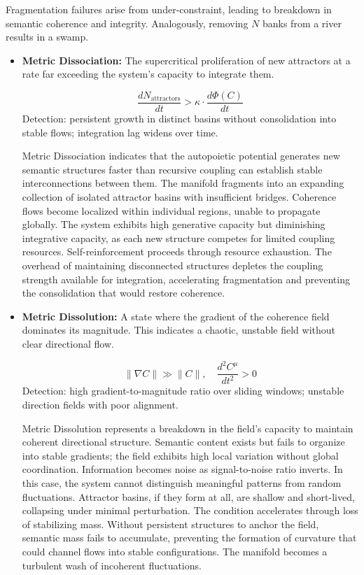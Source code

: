 Fragmentation failures arise from under-constraint, leading to breakdown in semantic coherence and integrity. Analogously, removing \(N\) banks from a river results in a swamp.

\begin{itemize}
    
    \item \textbf{Metric Dissociation:} The supercritical proliferation of new attractors at a rate far exceeding the system's capacity to integrate them.

    \begin{equation}
    \frac{dN_{\text{attractors}}}{dt} > \kappa \cdot \frac{d\Phi(C)}{dt}
    \end{equation}
    Detection: persistent growth in distinct basins without consolidation into stable flows; integration lag widens over time.

    Metric Dissociation indicates that the autopoietic potential generates new semantic structures faster than recursive coupling can establish stable interconnections between them. The manifold fragments into an expanding collection of isolated attractor basins with insufficient bridges. Coherence flows become localized within individual regions, unable to propagate globally. The system exhibits high generative capacity but diminishing integrative capacity, as each new structure competes for limited coupling resources. Self-reinforcement proceeds through resource exhaustion. The overhead of maintaining disconnected structures depletes the coupling strength available for integration, accelerating fragmentation and preventing the consolidation that would restore coherence.

    \item \textbf{Metric Dissolution:} A state where the gradient of the coherence field dominates its magnitude. This indicates a chaotic, unstable field without clear directional flow.

    \begin{equation}
    \|\nabla C\| \gg \|C\|, \quad \frac{d^2C^\mu}{dt^2} > 0
    \end{equation}
    Detection: high gradient-to-magnitude ratio over sliding windows; unstable direction fields with poor alignment.

    Metric Dissolution represents a breakdown in the field's capacity to maintain coherent directional structure. Semantic content exists but fails to organize into stable gradients; the field exhibits high local variation without global coordination. Information becomes noise as signal-to-noise ratio inverts. In this case, the system cannot distinguish meaningful patterns from random fluctuations. Attractor basins, if they form at all, are shallow and short-lived, collapsing under minimal perturbation. The condition accelerates through loss of stabilizing mass. Without persistent structures to anchor the field, semantic mass fails to accumulate, preventing the formation of curvature that could channel flows into stable configurations. The manifold becomes a turbulent wash of incoherent fluctuations.


\end{itemize}
